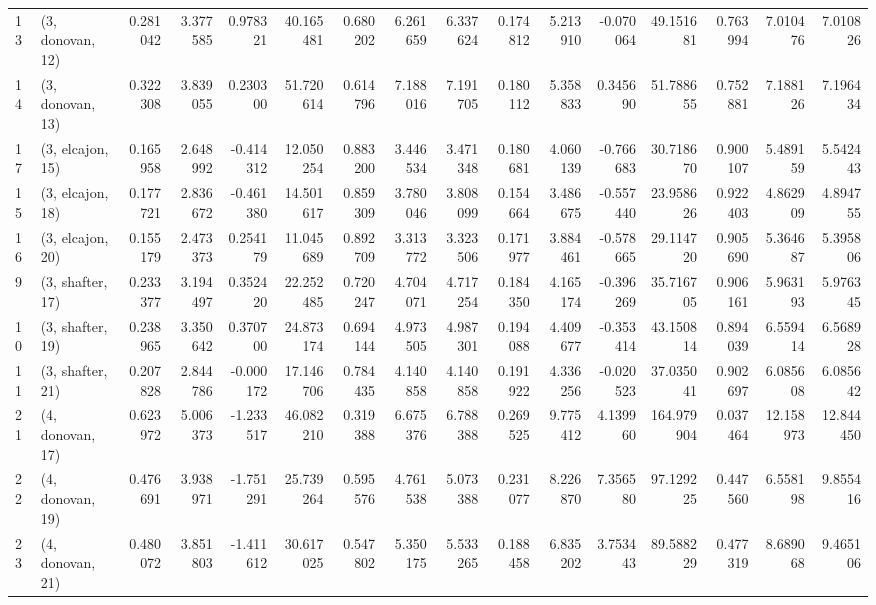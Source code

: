 \begin{tabular}{llrrrrrrrrrrrrrr}
13 &  (3, donovan, 12) &   0.281042 &  3.377585 &  0.978321 &  40.165481 &  0.680202 &   6.261659 &  6.337624 &  0.174812 &  5.213910 & -0.070064 &   49.151681 &  0.763994 &   7.010476 &   7.010826 \\
14 &  (3, donovan, 13) &   0.322308 &  3.839055 &  0.230300 &  51.720614 &  0.614796 &   7.188016 &  7.191705 &  0.180112 &  5.358833 &  0.345690 &   51.788655 &  0.752881 &   7.188126 &   7.196434 \\
17 &  (3, elcajon, 15) &   0.165958 &  2.648992 & -0.414312 &  12.050254 &  0.883200 &   3.446534 &  3.471348 &  0.180681 &  4.060139 & -0.766683 &   30.718670 &  0.900107 &   5.489159 &   5.542443 \\
15 &  (3, elcajon, 18) &   0.177721 &  2.836672 & -0.461380 &  14.501617 &  0.859309 &   3.780046 &  3.808099 &  0.154664 &  3.486675 & -0.557440 &   23.958626 &  0.922403 &   4.862909 &   4.894755 \\
16 &  (3, elcajon, 20) &   0.155179 &  2.473373 &  0.254179 &  11.045689 &  0.892709 &   3.313772 &  3.323506 &  0.171977 &  3.884461 & -0.578665 &   29.114720 &  0.905690 &   5.364687 &   5.395806 \\
9  &  (3, shafter, 17) &   0.233377 &  3.194497 &  0.352420 &  22.252485 &  0.720247 &   4.704071 &  4.717254 &  0.184350 &  4.165174 & -0.396269 &   35.716705 &  0.906161 &   5.963193 &   5.976345 \\
10 &  (3, shafter, 19) &   0.238965 &  3.350642 &  0.370700 &  24.873174 &  0.694144 &   4.973505 &  4.987301 &  0.194088 &  4.409677 & -0.353414 &   43.150814 &  0.894039 &   6.559414 &   6.568928 \\
11 &  (3, shafter, 21) &   0.207828 &  2.844786 & -0.000172 &  17.146706 &  0.784435 &   4.140858 &  4.140858 &  0.191922 &  4.336256 & -0.020523 &   37.035041 &  0.902697 &   6.085608 &   6.085642 \\
21 &  (4, donovan, 17) &   0.623972 &  5.006373 & -1.233517 &  46.082210 &  0.319388 &   6.675376 &  6.788388 &  0.269525 &  9.775412 &  4.139960 &  164.979904 &  0.037464 &  12.158973 &  12.844450 \\
22 &  (4, donovan, 19) &   0.476691 &  3.938971 & -1.751291 &  25.739264 &  0.595576 &   4.761538 &  5.073388 &  0.231077 &  8.226870 &  7.356580 &   97.129225 &  0.447560 &   6.558198 &   9.855416 \\
23 &  (4, donovan, 21) &   0.480072 &  3.851803 & -1.411612 &  30.617025 &  0.547802 &   5.350175 &  5.533265 &  0.188458 &  6.835202 &  3.753443 &   89.588229 &  0.477319 &   8.689068 &   9.465106 \\

\end{tabular}

